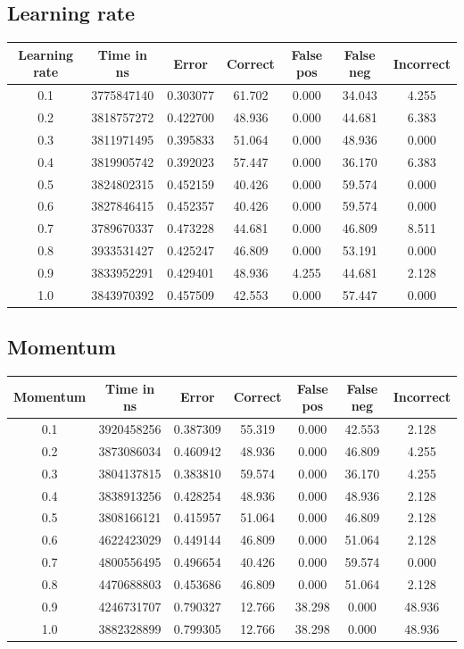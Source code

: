 \documentclass[12pt,a4,notitlepage]{report}
\renewcommand{\_}{\texttt{\symbol{95}}}
\newcommand{\<}{\texttt{\symbol{60}}}
\renewcommand{\>}{\texttt{\symbol{62}}}
\begin{document}
\subsection{Learning rate}

\begin{tabular}{c|cccccc}
Learning rate & Time in ns & Error & Correct & False pos & False neg & Incorrect \\ \hline
0.1 & 3775847140 & 0.303077 & 61.702 & 0.000 & 34.043 & 4.255 \\
0.2 & 3818757272 & 0.422700 & 48.936 & 0.000 & 44.681 & 6.383 \\
0.3 & 3811971495 & 0.395833 & 51.064 & 0.000 & 48.936 & 0.000 \\
0.4 & 3819905742 & 0.392023 & 57.447 & 0.000 & 36.170 & 6.383 \\
0.5 & 3824802315 & 0.452159 & 40.426 & 0.000 & 59.574 & 0.000 \\
0.6 & 3827846415 & 0.452357 & 40.426 & 0.000 & 59.574 & 0.000 \\
0.7 & 3789670337 & 0.473228 & 44.681 & 0.000 & 46.809 & 8.511 \\
0.8 & 3933531427 & 0.425247 & 46.809 & 0.000 & 53.191 & 0.000 \\
0.9 & 3833952291 & 0.429401 & 48.936 & 4.255 & 44.681 & 2.128 \\
1.0 & 3843970392 & 0.457509 & 42.553 & 0.000 & 57.447 & 0.000 \\
\end{tabular}

\subsection{Momentum}

\begin{tabular}{c|cccccc}
Momentum & Time in ns & Error & Correct & False pos & False neg & Incorrect \\ \hline
0.1 & 3920458256 & 0.387309 & 55.319 & 0.000 & 42.553 & 2.128  \\
0.2 & 3873086034 & 0.460942 & 48.936 & 0.000 & 46.809 & 4.255  \\
0.3 & 3804137815 & 0.383810 & 59.574 & 0.000 & 36.170 & 4.255  \\
0.4 & 3838913256 & 0.428254 & 48.936 & 0.000 & 48.936 & 2.128  \\
0.5 & 3808166121 & 0.415957 & 51.064 & 0.000 & 46.809 & 2.128  \\
0.6 & 4622423029 & 0.449144 & 46.809 & 0.000 & 51.064 & 2.128  \\
0.7 & 4800556495 & 0.496654 & 40.426 & 0.000 & 59.574 & 0.000  \\
0.8 & 4470688803 & 0.453686 & 46.809 & 0.000 & 51.064 & 2.128  \\
0.9 & 4246731707 & 0.790327 & 12.766 & 38.298 & 0.000 & 48.936  \\
1.0 & 3882328899 & 0.799305 & 12.766 & 38.298 & 0.000 & 48.936  \\
\end{tabular}
\end{document}
